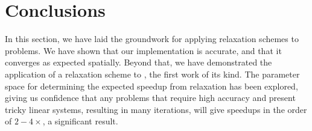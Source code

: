\section{Conclusions}\label{sec:laplace_conclusions}

In this section, we have laid the groundwork for applying relaxation schemes to {\fmmbem} problems. We have shown that our implementation is accurate, and that it converges as expected spatially. Beyond that, we have demonstrated the application of a relaxation scheme to {\fmmbem}, the first work of its kind. The parameter space for determining the expected speedup from relaxation has been explored, giving us confidence that any problems that require high accuracy and present tricky linear systems, resulting in many {\gmres} iterations, will give speedups in the order of $2-4\times$, a significant result.

